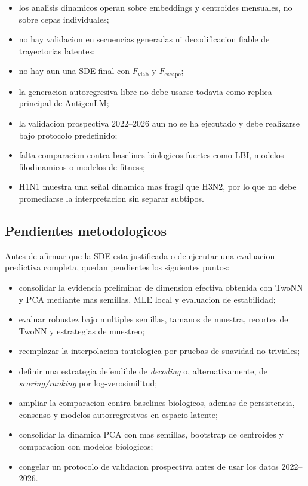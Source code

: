 \documentclass[12pt,letterpaper]{article}
\newcommand{\Fviab}{F_{\mathrm{viab}}}
\newcommand{\Fescape}{F_{\mathrm{escape}}}
\begin{document}
\begin{itemize}[leftmargin=2em]
    \item los analisis dinamicos operan sobre embeddings y centroides mensuales, no sobre cepas individuales;
    \item no hay validacion en secuencias generadas ni decodificacion fiable de trayectorias latentes;
    \item no hay aun una SDE final con $\Fviab$ y $\Fescape$;
    \item la generacion autoregresiva libre no debe usarse todavia como replica principal de AntigenLM;
    \item la validacion prospectiva 2022--2026 aun no se ha ejecutado y debe realizarse bajo protocolo predefinido;
    \item falta comparacion contra baselines biologicos fuertes como LBI, modelos filodinamicos o modelos de fitness;
    \item H1N1 muestra una señal dinamica mas fragil que H3N2, por lo que no debe promediarse la interpretacion sin separar subtipos.
\end{itemize}

\subsection{Pendientes metodologicos}

Antes de afirmar que la SDE esta justificada o de ejecutar una evaluacion predictiva completa, quedan pendientes los siguientes puntos:

\begin{itemize}[leftmargin=2em]
    \item consolidar la evidencia preliminar de dimension efectiva obtenida con TwoNN y PCA mediante mas semillas, MLE local y evaluacion de estabilidad;
    \item evaluar robustez bajo multiples semillas, tamanos de muestra, recortes de TwoNN y estrategias de muestreo;
    \item reemplazar la interpolacion tautologica por pruebas de suavidad no triviales;
    \item definir una estrategia defendible de \emph{decoding} o, alternativamente, de \emph{scoring/ranking} por log-verosimilitud;
    \item ampliar la comparacion contra baselines biologicos, ademas de persistencia, consenso y modelos autorregresivos en espacio latente;
    \item consolidar la dinamica PCA con mas semillas, bootstrap de centroides y comparacion con modelos biologicos;
    \item congelar un protocolo de validacion prospectiva antes de usar los datos 2022--2026.
\end{itemize}
\end{document}
